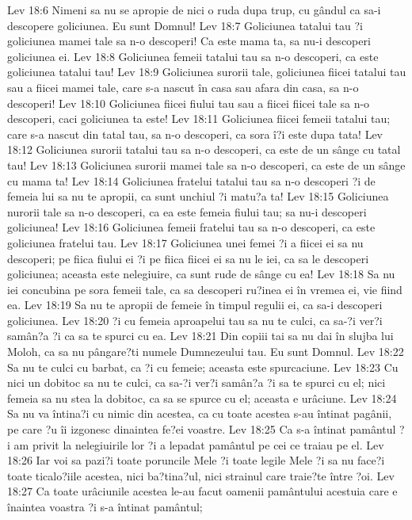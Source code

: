 Lev 18:6  Nimeni sa nu se apropie de nici o ruda dupa trup, cu gândul ca sa-i descopere goliciunea. Eu sunt Domnul!
Lev 18:7  Goliciunea tatalui tau ?i goliciunea mamei tale sa n-o descoperi! Ca este mama ta, sa nu-i descoperi goliciunea ei.
Lev 18:8  Goliciunea femeii tatalui tau sa n-o descoperi, ca este goliciunea tatalui tau!
Lev 18:9  Goliciunea surorii tale, goliciunea fiicei tatalui tau sau a fiicei mamei tale, care s-a nascut în casa sau afara din casa, sa n-o descoperi!
Lev 18:10  Goliciunea fiicei fiului tau sau a fiicei fiicei tale sa n-o descoperi, caci goliciunea ta este!
Lev 18:11  Goliciunea fiicei femeii tatalui tau; care s-a nascut din tatal tau, sa n-o descoperi, ca sora î?i este dupa tata!
Lev 18:12  Goliciunea surorii tatalui tau sa n-o descoperi, ca este de un sânge cu tatal tau!
Lev 18:13  Goliciunea surorii mamei tale sa n-o descoperi, ca este de un sânge cu mama ta!
Lev 18:14  Goliciunea fratelui tatalui tau sa n-o descoperi ?i de femeia lui sa nu te apropii, ca sunt unchiul ?i matu?a ta!
Lev 18:15  Goliciunea nurorii tale sa n-o descoperi, ca ea este femeia fiului tau; sa nu-i descoperi goliciunea!
Lev 18:16  Goliciunea femeii fratelui tau sa n-o descoperi, ca este goliciunea fratelui tau.
Lev 18:17  Goliciunea unei femei ?i a fiicei ei sa nu descoperi; pe fiica fiului ei ?i pe fiica fiicei ei sa nu le iei, ca sa le descoperi goliciunea; aceasta este nelegiuire, ca sunt rude de sânge cu ea!
Lev 18:18  Sa nu iei concubina pe sora femeii tale, ca sa descoperi ru?inea ei în vremea ei, vie fiind ea.
Lev 18:19  Sa nu te apropii de femeie în timpul regulii ei, ca sa-i descoperi goliciunea.
Lev 18:20  ?i cu femeia aproapelui tau sa nu te culci, ca sa-?i ver?i samân?a ?i ca sa te spurci cu ea.
Lev 18:21  Din copiii tai sa nu dai în slujba lui Moloh, ca sa nu pângare?ti numele Dumnezeului tau. Eu sunt Domnul.
Lev 18:22  Sa nu te culci cu barbat, ca ?i cu femeie; aceasta este spurcaciune.
Lev 18:23  Cu nici un dobitoc sa nu te culci, ca sa-?i ver?i samân?a ?i sa te spurci cu el; nici femeia sa nu stea la dobitoc, ca sa se spurce cu el; aceasta e urâciune.
Lev 18:24  Sa nu va întina?i cu nimic din acestea, ca cu toate acestea s-au întinat pagânii, pe care ?u îi izgonesc dinaintea fe?ei voastre.
Lev 18:25  Ca s-a întinat pamântul ?i am privit la nelegiuirile lor ?i a lepadat pamântul pe cei ce traiau pe el.
Lev 18:26  Iar voi sa pazi?i toate poruncile Mele ?i toate legile Mele ?i sa nu face?i toate ticalo?iile acestea, nici ba?tina?ul, nici strainul care traie?te între ?oi.
Lev 18:27  Ca toate urâciunile acestea le-au facut oamenii pamântului acestuia care e înaintea voastra ?i s-a întinat pamântul;
